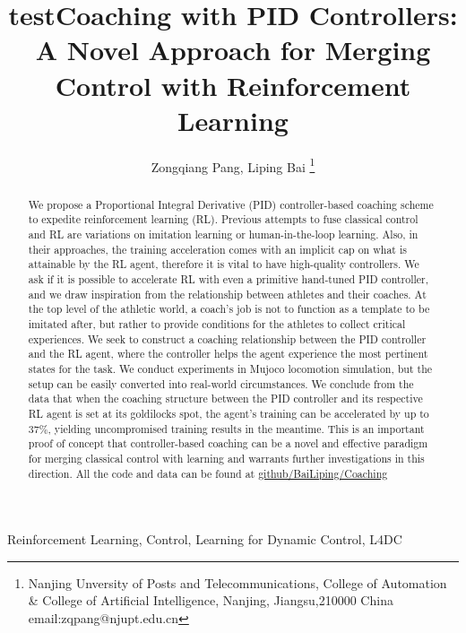 \documentclass[journal]{IEEEtran}
\begin{document}
    \title{test}
\title{Coaching with PID Controllers: A Novel Approach for Merging Control with Reinforcement Learning}

\author{ Zongqiang Pang, Liping Bai \thanks{Nanjing Unversity of Posts and Telecommunications, College of Automation \& College of Artificial Intelligence, Nanjing, Jiangsu,210000 China email:zqpang@njupt.edu.cn}}
\maketitle
\begin{abstract}
We propose a Proportional Integral Derivative (PID) controller-based coaching scheme to expedite reinforcement learning (RL). Previous attempts to fuse classical control and RL are variations on imitation learning or human-in-the-loop learning. Also, in their approaches, the training acceleration comes with an implicit cap on what is attainable by the RL agent, therefore it is vital to have high-quality controllers. We ask if it is possible to accelerate RL with even a primitive hand-tuned PID controller, and we draw inspiration from the relationship between athletes and their coaches. At the top level of the athletic world, a coach's job is not to function as a template to be imitated after, but rather to provide conditions for the athletes to collect critical experiences. We seek to construct a coaching relationship between the PID controller and the RL agent, where the controller helps the agent experience the most pertinent states for the task. We conduct experiments in Mujoco locomotion simulation, but the setup can be easily converted into real-world circumstances. We conclude from the data that when the coaching structure between the PID controller and its respective RL agent is set at its goldilocks spot, the agent's training can be accelerated by up to 37\%, yielding uncompromised training results in the meantime. This is an important proof of concept that controller-based coaching can be a novel and effective paradigm for merging classical control with learning and warrants further investigations in this direction. All the code and data can be found at \href{https://github.com/BaiLiping/Coaching}{github/BaiLiping/Coaching}
\end{abstract}
\begin{IEEEkeywords}
Reinforcement Learning, Control, Learning for Dynamic Control, L4DC
\end{IEEEkeywords}
\IEEEpeerreviewmaketitle
\end{document}
